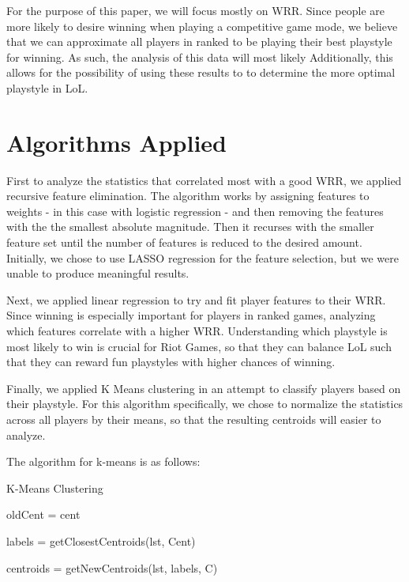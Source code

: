 \documentclass{article}
\begin{document}
	For the purpose of this paper, we will focus mostly on WRR. Since people are more likely to desire winning when playing a competitive game mode, we believe that we can approximate all players in ranked to be playing their best playstyle for winning. As such, the analysis of this data will most likely Additionally, this allows for the possibility of using these results to to determine the more optimal playstyle in LoL.
	
	
	\section{Algorithms Applied}
	First to analyze the statistics that correlated most with a good WRR, we applied recursive feature elimination. The algorithm works by assigning features to weights - in this case with logistic regression - and then removing the features with the the smallest absolute magnitude. Then it recurses with the smaller feature set until the number of features is reduced to the desired amount. Initially, we chose to use LASSO regression for the feature selection, but we were unable to produce meaningful results.	
	
	Next, we applied linear regression to try and fit player features to their WRR. Since winning is especially important for players in ranked games, analyzing which features correlate with a higher WRR. Understanding which playstyle is most likely to win is crucial for Riot Games, so that they can balance LoL such that they can reward fun playstyles with higher chances of winning. 
	
	Finally, we applied K Means clustering in an attempt to classify players based on their playstyle. For this algorithm specifically, we chose to normalize the statistics across all players by their means, so that the resulting centroids will easier to analyze.
	
	The algorithm for k-means is as follows:
	
	\begin{algorithm}[H]
		\caption{K-Means Clustering}
		
		{oldCent = cent\
		
		
		
		 labels = getClosestCentroids(lst, Cent)	
		 \
		 
		 
		 centroids = getNewCentroids(lst, labels, C)
		 \	}
	\end{algorithm}
	
\end{document}
